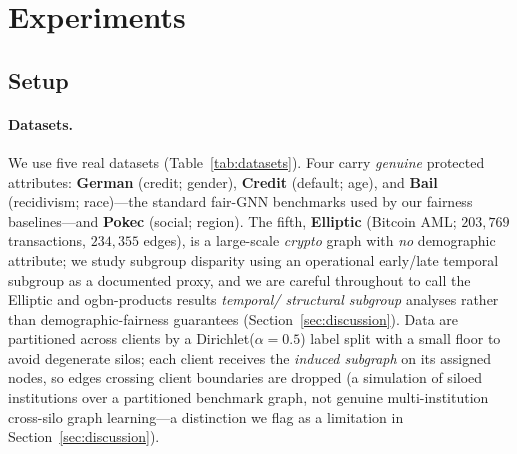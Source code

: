 \documentclass[pdflatex,sn-mathphys-num]{sn-jnl}
\theoremstyle{thmstyleone}%
\theoremstyle{thmstyletwo}%
\theoremstyle{thmstylethree}%
\begin{document}
\section{Experiments}
\label{sec:experiments}

\subsection{Setup}
\label{sec:setup}
\paragraph{Datasets.}
We use five real datasets (Table~\ref{tab:datasets}). Four carry \emph{genuine}
protected attributes: \textbf{German} (credit; gender), \textbf{Credit}
(default; age), and \textbf{Bail} (recidivism; race)---the standard fair-GNN
benchmarks used by our fairness baselines---and \textbf{Pokec} (social; region).
The fifth, \textbf{Elliptic} (Bitcoin AML; $203{,}769$ transactions,
$234{,}355$ edges), is a large-scale \emph{crypto} graph with \emph{no}
demographic attribute; we study subgroup disparity using an operational
early/late temporal subgroup as a documented proxy, and we are careful
throughout to call the Elliptic and ogbn-products results \emph{temporal/
structural subgroup} analyses rather than demographic-fairness guarantees
(Section~\ref{sec:discussion}). Data are partitioned across clients by a
Dirichlet($\alpha{=}0.5$) label split with a small floor to avoid degenerate
silos; each client receives the \emph{induced subgraph} on its assigned nodes,
so edges crossing client boundaries are dropped (a simulation of siloed
institutions over a partitioned benchmark graph, not genuine multi-institution
cross-silo graph learning---a distinction we flag as a limitation in
Section~\ref{sec:discussion}).

\begin{table}[t]\centering\small
\caption{Datasets. $^\dagger$Elliptic uses an operational early/late temporal
subgroup as a documented proxy (not a protected demographic).}
\label{tab:datasets}

\end{table}
\end{document}

